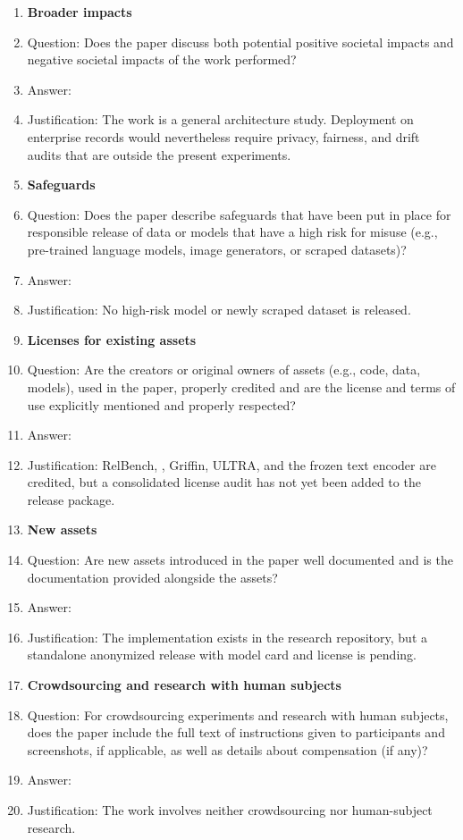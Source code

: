 \begin{enumerate}
\item \textbf{Broader impacts}
  \item[] Question: Does the paper discuss both potential positive societal impacts and negative societal impacts of the work performed?
  \item[] Answer: \answerNo{}
  \item[] Justification: The work is a general architecture study. Deployment on
  enterprise records would nevertheless require privacy, fairness, and drift
  audits that are outside the present experiments.

\item \textbf{Safeguards}
  \item[] Question: Does the paper describe safeguards that have been put in place for responsible release of data or models that have a high risk for misuse (e.g., pre-trained language models, image generators, or scraped datasets)?
  \item[] Answer: \answerNA{}
  \item[] Justification: No high-risk model or newly scraped dataset is released.

\item \textbf{Licenses for existing assets}
  \item[] Question: Are the creators or original owners of assets (e.g., code, data, models), used in the paper, properly credited and are the license and terms of use explicitly mentioned and properly respected?
  \item[] Answer: \answerNo{}
  \item[] Justification: RelBench, \RT{}, Griffin, ULTRA, and the frozen text
  encoder are credited, but a consolidated license audit has not yet been added
  to the release package.

\item \textbf{New assets}
  \item[] Question: Are new assets introduced in the paper well documented and is the documentation provided alongside the assets?
  \item[] Answer: \answerNo{}
  \item[] Justification: The implementation exists in the research repository,
  but a standalone anonymized release with model card and license is pending.

\item \textbf{Crowdsourcing and research with human subjects}
  \item[] Question: For crowdsourcing experiments and research with human subjects, does the paper include the full text of instructions given to participants and screenshots, if applicable, as well as details about compensation (if any)?
  \item[] Answer: \answerNA{}
  \item[] Justification: The work involves neither crowdsourcing nor human-subject research.


\end{enumerate}

